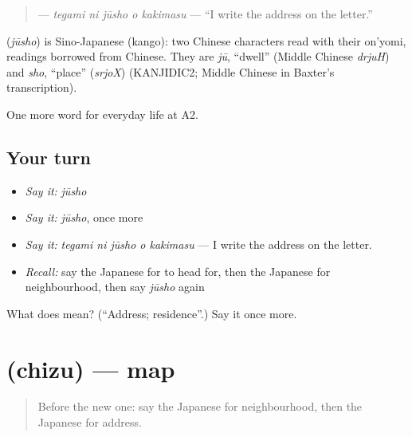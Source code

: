 \begin{quote}
\textbf{  } — \emph{tegami ni jūsho o kakimasu} — \textquotedblleft{}I write the address on the letter.\textquotedblright{}
\end{quote}

\begin{cousinweb}
\textbf{} (\emph{jūsho}) is Sino-Japanese (kango): two Chinese characters read with their on'yomi, readings borrowed from Chinese. They are \emph{jū}, \textquotedblleft{}dwell\textquotedblright{} (Middle Chinese \emph{drjuH}) and \emph{sho}, \textquotedblleft{}place\textquotedblright{} (\emph{srjoX}) (KANJIDIC2; Middle Chinese in Baxter's transcription).
\end{cousinweb}

\begin{grammarlens}[title={What you've built}]
One more word for everyday life at A2.
\end{grammarlens}

\subsection*{Your turn}
\begin{itemize}
\raggedright
  \item \emph{Say it:} \emph{jūsho}
  \item \emph{Say it:} \emph{jūsho}, once more
  \item \emph{Say it:} \emph{tegami ni jūsho o kakimasu} — I write the address on the letter.
  \item \emph{Recall:} say the Japanese for to head for, then the Japanese for neighbourhood, then say \emph{jūsho} again
\end{itemize}

\begin{tcolorbox}[breakable,colback=teal!4,colframe=teal!35!black,title={Before you move on}]
What does  mean? (\textquotedblleft{}Address; residence\textquotedblright{}.) Say it once more.
\end{tcolorbox}
\section[\texorpdfstring{\ja{ちず} (chizu)}{ちず (chizu)}]{ (chizu) — map}

\label{lesson:JA-C196-chizu}



\begin{quote}
Before the new one: say the Japanese for neighbourhood, then the Japanese for address.
\end{quote}

